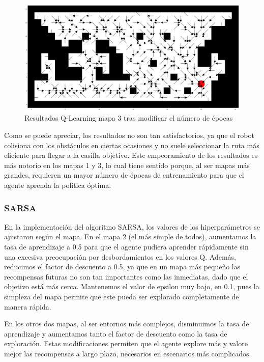 \documentclass[conference,a4paper]{IEEEtran}
\begin{document}
\begin{figure}[h]
  \includegraphics[scale=0.25]{resultado_2_qlearning_mapa_3}
  \caption{Resultados Q-Learning mapa 3 tras modificar el número de épocas}
  \label{fig:resultado_2_qlearning_mapa_3}
  \vspace{0.5cm}
\end{figure}
  Como se puede apreciar, los resultados no son tan satisfactorios, ya que el robot colisiona con los obstáculos en ciertas ocasiones y no suele seleccionar la ruta más eficiente para llegar a la casilla objetivo. 
  Este empeoramiento de los resultados es más notorio en los mapas 1 y 3, lo cual tiene sentido porque, al ser mapas más grandes, requieren un mayor número de épocas de entrenamiento para que el agente aprenda la política óptima.

\subsubsection{\textbf{SARSA}}

En la implementación del algoritmo SARSA, los valores de los hiperparámetros se ajustaron según el mapa. En el mapa 2 (el más simple de todos), aumentamos la tasa de aprendizaje a 0.5 para que el agente pudiera aprender rápidamente sin una excesiva preocupación por desbordamientos en los valores Q.
Además, reducimos el factor de descuento a 0.5, ya que en un mapa más pequeño las recompensas futuras no son tan importantes como las inmediatas, dado que el objetivo está más cerca.
Mantenemos el valor de epsilon muy bajo, en 0.1, pues la simpleza del mapa permite que este pueda ser explorado completamente de manera rápida.

En los otros dos mapas, al ser entornos más complejos, disminuimos la tasa de aprendizaje y aumentamos tanto el factor de descuento como la tasa de exploración. Estas modificaciones permiten que el agente explore más y valore mejor las recompensas a largo plazo, necesarios en escenarios más complicados.
\end{document}
